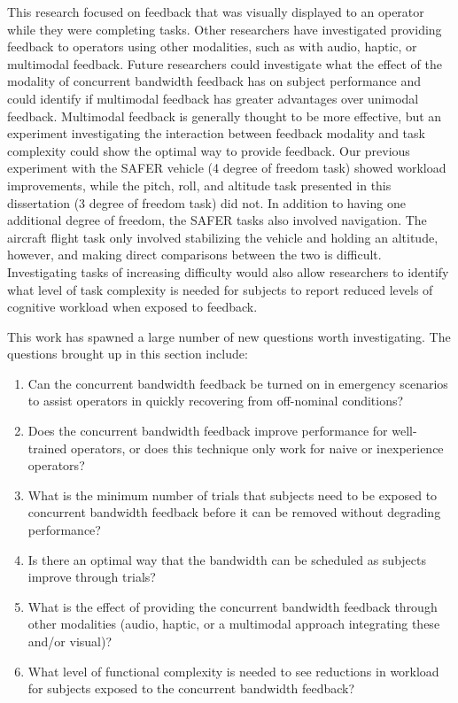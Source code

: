 This research focused on feedback that was visually displayed to an operator while they were completing tasks.
Other researchers have investigated providing feedback to operators using other modalities, such as with audio, haptic, or multimodal feedback.
Future researchers could investigate what the effect of the modality of concurrent bandwidth feedback has on subject performance and could identify if multimodal feedback has greater advantages over unimodal feedback.
Multimodal feedback is generally thought to be more effective, but an experiment investigating the interaction between feedback modality and task complexity could show the optimal way to provide feedback.
Our previous experiment with the SAFER vehicle (4 degree of freedom task) showed workload improvements, while the pitch, roll, and altitude task presented in this dissertation (3 degree of freedom task) did not.
In addition to having one additional degree of freedom, the SAFER tasks also involved navigation.
The aircraft flight task only involved stabilizing the vehicle and holding an altitude, however, and making direct comparisons between the two is difficult.
Investigating tasks of increasing difficulty would also allow researchers to identify what level of task complexity is needed for subjects to report reduced levels of cognitive workload when exposed to feedback.

This work has spawned a large number of new questions worth investigating.
The questions brought up in this section include:
\begin{enumerate}
    \item Can the concurrent bandwidth feedback be turned on in emergency scenarios to assist operators in quickly recovering from off-nominal conditions?
    \item Does the concurrent bandwidth feedback improve performance for well-trained operators, or does this technique only work for naive or inexperience operators?
    \item What is the minimum number of trials that subjects need to be exposed to concurrent bandwidth feedback before it can be removed without degrading performance?
    \item Is there an optimal way that the bandwidth can be scheduled as subjects improve through trials?
    \item What is the effect of providing the concurrent bandwidth feedback through other modalities (audio, haptic, or a multimodal approach integrating these and/or visual)?
    \item What level of functional complexity is needed to see reductions in workload for subjects exposed to the concurrent bandwidth feedback?
\end{enumerate}
